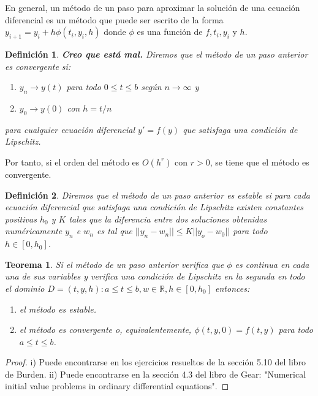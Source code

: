 \documentclass{article}
\theoremstyle{theorem-style}  %
\newtheorem{theorem}{Teorema}[section]  %
\theoremstyle{definition-style}
\newtheorem{definition}{Definición}[section]
\theoremstyle{example-style}
\begin{document}
	En general, un método de un paso para aproximar la solución de una ecuación diferencial es un método que puede ser escrito de la forma $y_{i+1}=y_i + h \phi(t_i,y_i,h)$ donde $\phi$ es una función de $f, t_i, y_i$ y $h$. 
	
	\begin{definition}
		\textbf{Creo que está mal.} Diremos que el método de un paso anterior es convergente si:
		\begin{enumerate}
			\item $y_n \to y(t)$ para todo $0 \le t \le b$ según $n \to \infty$ y 
			\item $y_0 \to y(0)$ con $h=t/n$
		\end{enumerate}
		para cualquier ecuación diferencial $y'=f(y)$ que satisfaga una condición de Lipschitz.
	\end{definition}
	
	Por tanto, si el orden del método es $O(h^r)$ con $r > 0$, se tiene que el método es convergente.
	
	\begin{definition}
		Diremos que el método de un paso anterior es estable si para cada ecuación diferencial que satisfaga una condición de Lipschitz existen constantes positivas $h_0$ y $K$ tales que la diferencia entre dos soluciones obtenidas numéricamente $y_n$ e $w_n$ es tal que $||y_n-w_n|| \leq K ||y_o-w_0||$ para todo $h \in [0,h_0]$.
	\end{definition}
	
	\begin{theorem}
		Si el método de un paso anterior verifica que $\phi$ es continua en cada una de sus variables y verifica una condición de Lipschitz en la segunda en todo el dominio $D={(t,y,h):a \leq t \leq b, w \in \mathbb{R}, h \in [0,h_0]}$ entonces:
		\begin{enumerate}
			\item el método es estable. 
			\item el método es convergente o, equivalentemente, $\phi(t,y,0)=f(t,y)$ para todo $a \leq t \leq b$.
		\end{enumerate}		
	\end{theorem}
	
	\begin{proof}
		i) Puede encontrarse en los ejercicios resueltos de la sección 5.10 del libro de Burden. ii) Puede encontrarse en la sección 4.3 del libro de Gear: "Numerical initial value problems in ordinary differential equations".
	\end{proof}
	
\end{document}
